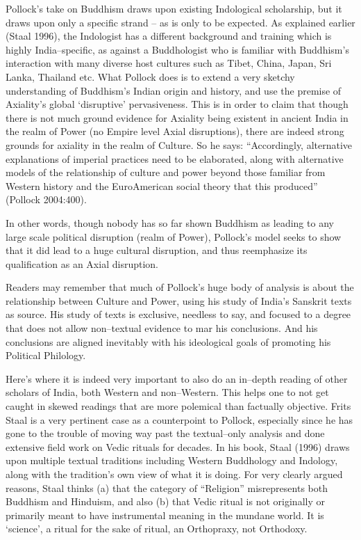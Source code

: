 Pollock’s take on Buddhism draws upon existing Indological scholarship, but it draws upon only a specific strand – as is only to be expected. As explained earlier (Staal 1996), the Indologist has a different background and training which is highly India–specific, as against a Buddhologist who is familiar with Buddhism’s interaction with many diverse host cultures such as Tibet, China, Japan, Sri Lanka, Thailand etc. What Pollock does is to extend a very sketchy understanding of Buddhism’s Indian origin and history, and use the premise of Axiality’s global ‘disruptive’ pervasiveness. This is in order to claim that though there is not much ground evidence for Axiality being existent in ancient India in the realm of Power (no Empire level Axial disruptions), there are indeed strong grounds for axiality in the realm of Culture. So he says: “Accordingly, alternative explanations of imperial practices need to be elaborated, along with alternative models of the relationship of culture and power beyond those familiar from Western history and the EuroAmerican social theory that this produced” (Pollock 2004:400).

In other words, though nobody has so far shown Buddhism as leading to any large scale political disruption (realm of Power), Pollock’s model seeks to show that it did lead to a huge cultural disruption, and thus reemphasize its qualification as an Axial disruption.

Readers may remember that much of Pollock’s huge body of analysis is about the relationship between Culture and Power, using his study of India’s Sanskrit texts as source. His study of texts is exclusive, needless to say, and focused to a degree that does not allow non–textual evidence to mar his conclusions. And his conclusions are aligned inevitably with his ideological goals of promoting his Political Philology.

Here’s where it is indeed very important to also do an in–depth reading of other scholars of India, both Western and non–Western. This helps one to not get caught in skewed readings that are more polemical than factually objective. Frits Staal is a very pertinent case as a counterpoint to Pollock, especially since he has gone to the trouble of moving way past the textual–only analysis and done extensive field work on Vedic rituals for decades. In his book, Staal (1996) draws upon multiple textual traditions including Western Buddhology and Indology, along with the tradition’s own view of what it is doing. For very clearly argued reasons, Staal thinks (a) that the category of “Religion” misrepresents both Buddhism and Hinduism, and also (b) that Vedic ritual is not originally or primarily meant to have instrumental meaning in the mundane world. It is ‘science’, a ritual for the sake of ritual, an Orthopraxy, not Orthodoxy.

